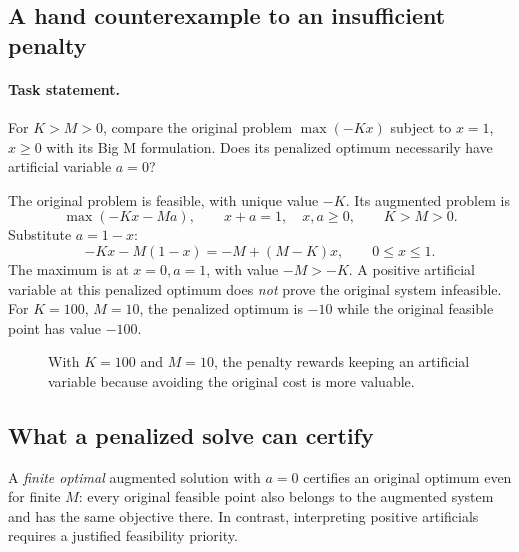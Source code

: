 \documentclass[11pt,a4paper]{article}
\begin{document}
\subsection{A hand counterexample to an insufficient penalty}
\paragraph{Task statement.}
For $K>M>0$, compare the original problem $\max(-Kx)$ subject to
$x=1$, $x\geq0$ with its Big M formulation. Does its penalized optimum
necessarily have artificial variable $a=0$?

The original problem is feasible, with unique value $-K$.
Its augmented problem is
\[
  \max(-Kx-Ma),\qquad x+a=1,\quad x,a\geq0,
  \qquad K>M>0.
\]
Substitute $a=1-x$:
\[
  -Kx-M(1-x)=-M+(M-K)x,\qquad 0\leq x\leq1.
\]
The maximum is at $x=0,a=1$, with value $-M>-K$. A positive artificial
variable at this penalized optimum does \emph{not} prove the original system
infeasible. For $K=100$, $M=10$, the penalized optimum is $-10$ while the
original feasible point has value $-100$.
\begin{figure}[H]
  \centering
  \caption{With $K=100$ and $M=10$, the penalty rewards keeping an artificial
    variable because avoiding the original cost is more valuable.}
  \label{fig:big-m}
\end{figure}

\subsection{What a penalized solve can certify}
A \emph{finite optimal} augmented solution with $a=0$ certifies an original
optimum even for finite $M$: every original feasible point also belongs to the
augmented system and has the same objective there. In contrast, interpreting
positive artificials requires a justified feasibility priority.
\end{document}
